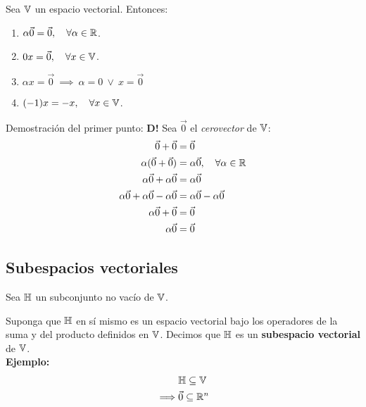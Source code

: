 \begin{teorema}
{
    Sea $\mathbb{V}$ un espacio vectorial. Entonces: \\
    \begin{enumerate}
        \item $\alpha \vec{0} = \vec{0}, \quad \forall \alpha \in \mathbb{R}$.
        \item $0x = \vec{0}, \quad \forall x \in \mathbb{V}$.
        \item $\alpha x = \vec{0} \ \implies \ \alpha = 0 \ \lor \ x = \vec{0}$
        \item $(-1)x = -x, \quad \forall x \in \mathbb{V}$.
    \end{enumerate}

    \vspace*{1em}

    Demostración del primer punto: \textbf{D!} Sea $\vec{0}$ el \textit{cerovector} de $\mathbb{V}$:
    \begin{align*}
        \vec{0} + \vec{0} &= \vec{0} \\
        \alpha (\vec{0} + \vec{0}) &= \alpha \vec{0}, \quad \forall \alpha \in \mathbb{R} \\
        \alpha \vec{0} + \alpha \vec{0} &= \alpha \vec{0} \\
        \alpha \vec{0} + \alpha \vec{0} - \alpha \vec{0} &= \alpha \vec{0} - \alpha \vec{0} \\
        \alpha \vec{0} + \vec{0} &= \vec{0} \\
        \alpha \vec{0} &= \vec{0}
    \end{align*}
}
\end{teorema}

\subsection{Subespacios vectoriales}
\label{sec:subespacios_vectoriales}

\begin{definition}
{
    Sea $\mathbb{H}$ un subconjunto no vacío de $\mathbb{V}$.

    Suponga que $\mathbb{H}$ en sí mismo es un espacio vectorial bajo los operadores de la suma y del producto definidos en $\mathbb{V}$. Decimos que $\mathbb{H}$ es un \textbf{subespacio vectorial} de $\mathbb{V}$. \\

    \textbf{Ejemplo:}
    \begin{align*}
        &\mathbb{H} \subseteq \mathbb{V} \\
        \implies &\vec{0} \subseteq \mathbb{R}^n \\
    \end{align*}
}
\end{definition}

